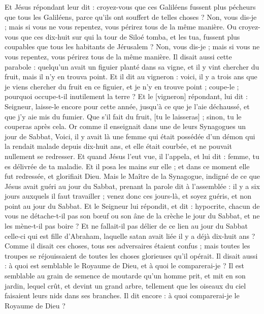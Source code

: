 \begin{multicols}{2}
Et Jésus répondant leur dit : croyez-vous que ces Galiléens fussent plus pécheurs que tous les Galiléens, parce qu'ils ont souffert de telles choses ?
Non, vous dis-je ; mais si vous ne vous repentez, vous périrez tous de la même manière.
Ou croyez-vous que ces dix-huit sur qui la tour de Siloé tomba, et les tua, fussent plus coupables que tous les habitants de Jérusalem ?
Non, vous dis-je ; mais si vous ne vous repentez, vous périrez tous de la même manière.
Il disait aussi cette parabole : quelqu'un avait un figuier planté dans sa vigne, et il y vint chercher du fruit, mais il n'y en trouva point.
Et il dit au vigneron : voici, il y a trois ans que je viens chercher du fruit en ce figuier, et je n'y en trouve point ; coupe-le ; pourquoi occupe-t-il inutilement la terre ?
Et le [vigneron] répondant, lui dit : Seigneur, laisse-le encore pour cette année, jusqu'à ce que je l'aie déchaussé, et que j'y aie mis du fumier.
Que s'il fait du fruit, [tu le laisseras] ; sinon, tu le couperas après cela.
Or comme il enseignait dans une de leurs Synagogues un jour de Sabbat,
Voici, il y avait là une femme qui était possédée d'un démon qui la rendait malade depuis dix-huit ans, et elle était courbée, et ne pouvait nullement se redresser.
Et quand Jésus l'eut vue, il l'appela, et lui dit : femme, tu es délivrée de ta maladie.
Et il posa les mains sur elle ; et dans ce moment elle fut redressée, et glorifiait Dieu.
Mais le Maître de la Synagogue, indigné de ce que Jésus avait guéri au jour du Sabbat, prenant la parole dit à l'assemblée : il y a six jours auxquels il faut travailler ; venez donc ces jours-là, et soyez guéris, et non point au jour du Sabbat.
Et le Seigneur lui répondit, et dit : hypocrite, chacun de vous ne détache-t-il pas son bœuf ou son âne de la crèche le jour du Sabbat, et ne les mène-t-il pas boire ?
Et ne fallait-il pas délier de ce lien au jour du Sabbat celle-ci qui est fille d'Abraham, laquelle satan avait liée il y a déjà dix-huit ans ?
Comme il disait ces choses, tous ses adversaires étaient confus ; mais toutes les troupes se réjouissaient de toutes les choses glorieuses qu'il opérait.
Il disait aussi : à quoi est semblable le Royaume de Dieu, et à quoi le comparerai-je ?
Il est semblable au grain de semence de moutarde qu'un homme prit, et mit en son jardin, lequel crût, et devint un grand arbre, tellement que les oiseaux du ciel faisaient leurs nids dans ses branches.
Il dit encore : à quoi comparerai-je le Royaume de Dieu ?

\end{multicols}
